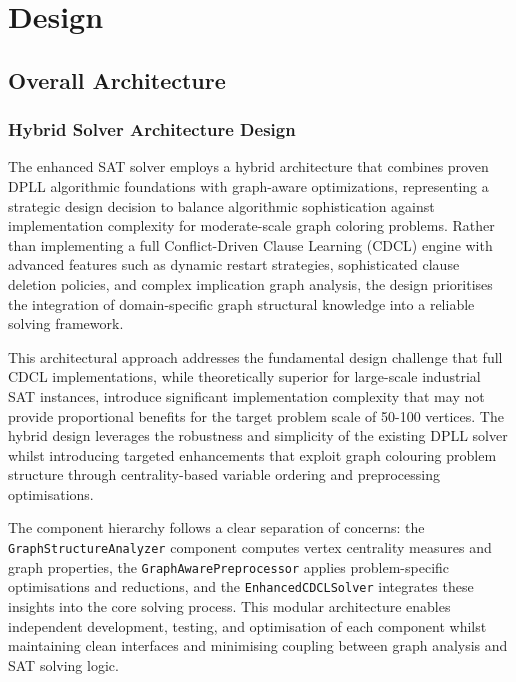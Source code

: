 \section{Design}

\subsection{Overall Architecture}

\subsubsection{Hybrid Solver Architecture Design}

The enhanced SAT solver employs a hybrid architecture that combines proven DPLL algorithmic foundations with graph-aware optimizations, representing a strategic design decision to balance algorithmic sophistication against implementation complexity for moderate-scale graph coloring problems. Rather than implementing a full Conflict-Driven Clause Learning (CDCL) engine with advanced features such as dynamic restart strategies, sophisticated clause deletion policies, and complex implication graph analysis, the design prioritises the integration of domain-specific graph structural knowledge into a reliable solving framework.

This architectural approach addresses the fundamental design challenge that full CDCL implementations, while theoretically superior for large-scale industrial SAT instances, introduce significant implementation complexity that may not provide proportional benefits for the target problem scale of 50-100 vertices. The hybrid design leverages the robustness and simplicity of the existing DPLL solver whilst introducing targeted enhancements that exploit graph colouring problem structure through centrality-based variable ordering and preprocessing optimisations.

The component hierarchy follows a clear separation of concerns: the \texttt{Graph\-Structure\-Analyzer} component computes vertex centrality measures and graph properties, the \texttt{GraphAwarePreprocessor} applies problem-specific optimisations and reductions, and the \texttt{EnhancedCDCLSolver} integrates these insights into the core solving process. This modular architecture enables independent development, testing, and optimisation of each component whilst maintaining clean interfaces and minimising coupling between graph analysis and SAT solving logic.

